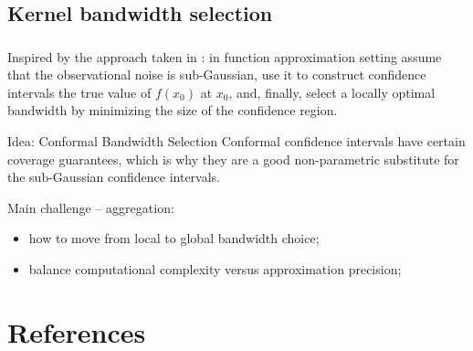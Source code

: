 \documentclass[t]{beamer}  %
\begin{document}

\subsection{Kernel bandwidth selection} %
\label{sub:kernel_bandwidth_selection}

\begin{frame}[t]\frametitle{\insertsection}
  \framesubtitle{\insertsubsection}
  Inspired by the approach taken in \cite{goldenshluger1997}: in function approximation
  setting assume that the observational noise is sub-Gaussian, use it to construct
  confidence intervals the true value of $f(x_0)$ at $x_0$, and, finally, select
  a locally optimal bandwidth by minimizing the size of the confidence region. 

  \begin{block}{Idea: Conformal Bandwidth Selection}
    Conformal confidence intervals have certain coverage guarantees, which is
    why they are a good non-parametric substitute for the sub-Gaussian confidence 
    intervals.

    Main challenge -- aggregation: \begin{itemize}
      \item how to move from local to global bandwidth choice;
      \item balance computational complexity versus approximation precision;
    \end{itemize}
  \end{block}
\end{frame}



\section{References} %
\label{sec:references}

\begin{frame}[t, shrink=25]\frametitle{\insertsection}
  \printbibliography
\end{frame}

\end{document}
